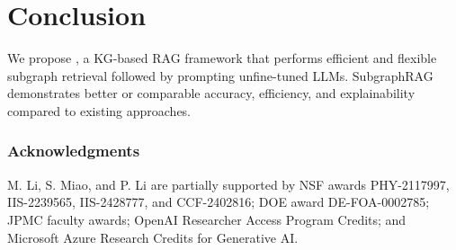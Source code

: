 \section{Conclusion}

We propose \proj, a KG-based RAG framework that performs efficient and flexible subgraph retrieval followed by prompting unfine-tuned LLMs. SubgraphRAG demonstrates better or comparable accuracy, efficiency, and explainability compared to existing approaches.

\subsubsection*{Acknowledgments}

M. Li, S. Miao, and P. Li are partially supported by NSF awards PHY-2117997, IIS-2239565, IIS-2428777, and CCF-2402816; DOE award DE-FOA-0002785; JPMC faculty awards; OpenAI Researcher Access Program Credits; and Microsoft Azure Research Credits for Generative AI.
